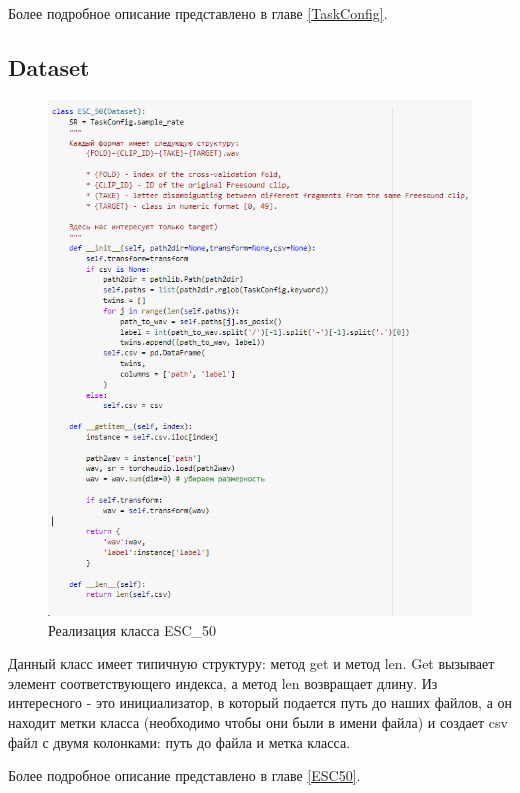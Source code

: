 \documentclass[a4paper,12pt]{article}
\begin{document}
	Более подробное описание представлено в главе \ref{TaskConfig}.

 	
 	\subsection{Dataset}
 	\begin{figure}[H]
 		\centering
 		\includegraphics[width=0.7\linewidth]{Image/Dataset}
 		\caption{Реализация класса ESC\_50}
 		\label{fig:dataset}
 	\end{figure}
 	
 	Данный класс имеет типичную структуру: метод get и метод len. Get вызывает элемент соответствующего индекса, а метод len возвращает длину. Из интересного - это инициализатор, в который подается путь до наших файлов, а он находит метки класса (необходимо чтобы они были в имени файла) и создает csv файл с двумя колонками: путь до файла и метка класса.
 	
  Более подробное описание представлено в главе \ref{ESC50}.
  
\end{document}
